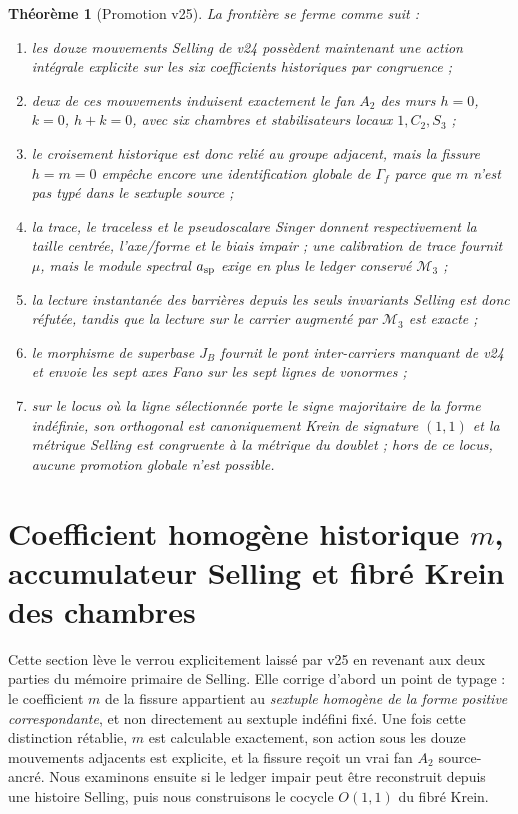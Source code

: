 \documentclass[11pt,a4paper]{article}
\newtheorem{theorem}{Théorème}[section]
\begin{document}
\begin{theorem}[Promotion v25]\label{thm:v25-verdict}
La frontière se ferme comme suit :
\begin{enumerate}[label=\textup{(\roman*)}]
\item les douze mouvements Selling de v24 possèdent maintenant une action intégrale explicite sur les six coefficients historiques par congruence ;
\item deux de ces mouvements induisent exactement le fan $A_2$ des murs $h=0$, $k=0$, $h+k=0$, avec six chambres et stabilisateurs locaux $1,C_2,S_3$ ;
\item le croisement historique est donc relié au groupe adjacent, mais la fissure $h=m=0$ empêche encore une identification globale de $\Gamma_f$ parce que $m$ n'est pas typé dans le sextuple source ;
\item la trace, le traceless et le pseudoscalare Singer donnent respectivement la taille centrée, l'axe/forme et le biais impair ; une calibration de trace fournit $\mu$, mais le module spectral $a_{\rm sp}$ exige en plus le ledger conservé $\mathcal M_3$ ;
\item la lecture instantanée des barrières depuis les seuls invariants Selling est donc réfutée, tandis que la lecture sur le carrier augmenté par $\mathcal M_3$ est exacte ;
\item le morphisme de superbase $J_B$ fournit le pont inter-carriers manquant de v24 et envoie les sept axes Fano sur les sept lignes de vonormes ;
\item sur le locus où la ligne sélectionnée porte le signe majoritaire de la forme indéfinie, son orthogonal est canoniquement Krein de signature $(1,1)$ et la métrique Selling est congruente à la métrique du doublet ; hors de ce locus, aucune promotion globale n'est possible.
\end{enumerate}
\end{theorem}


\section{Coefficient homogène historique \texorpdfstring{$m$}{m}, accumulateur Selling et fibré Krein des chambres}\label{sec:v26-m-ledger-krein-bundle}

Cette section lève le verrou explicitement laissé par v25 en revenant aux deux parties du mémoire primaire de Selling. Elle corrige d'abord un point de typage : le coefficient $m$ de la fissure appartient au \emph{sextuple homogène de la forme positive correspondante}, et non directement au sextuple indéfini fixé. Une fois cette distinction rétablie, $m$ est calculable exactement, son action sous les douze mouvements adjacents est explicite, et la fissure reçoit un vrai fan $A_2$ source-ancré. Nous examinons ensuite si le ledger impair peut être reconstruit depuis une histoire Selling, puis nous construisons le cocycle $O(1,1)$ du fibré Krein.
\end{document}
